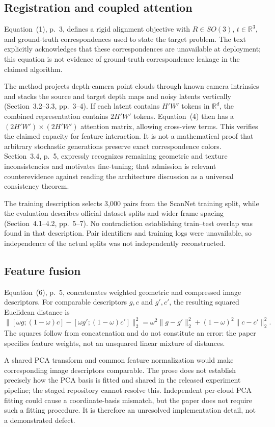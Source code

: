 \documentclass[10pt]{article}
\begin{document}
\subsection*{Registration and coupled attention}
Equation (1), p. 3, defines a rigid alignment objective with \(R\in SO(3)\), \(t\in\mathbb R^3\), and ground-truth correspondences used to state the target problem. The text explicitly acknowledges that these correspondences are unavailable at deployment; this equation is not evidence of ground-truth correspondence leakage in the claimed algorithm.\par
The method projects depth-camera point clouds through known camera intrinsics and stacks the source and target depth maps and noisy latents vertically (Section 3.2–3.3, pp. 3–4). If each latent contains \(H'W'\) tokens in \(\mathbb R^d\), the combined representation contains \(2H'W'\) tokens. Equation (4) then has a \((2H'W')\times(2H'W')\) attention matrix, allowing cross-view terms. This verifies the claimed capacity for feature interaction. It is not a mathematical proof that arbitrary stochastic generations preserve exact correspondence colors. Section 3.4, p. 5, expressly recognizes remaining geometric and texture inconsistencies and motivates fine-tuning; that admission is relevant counterevidence against reading the architecture discussion as a universal consistency theorem.\par
The training description selects 3,000 pairs from the ScanNet training split, while the evaluation describes official dataset splits and wider frame spacing (Section 4.1–4.2, pp. 5–7). No contradiction establishing train–test overlap was found in that description. Pair identifiers and training logs were unavailable, so independence of the actual splits was not independently reconstructed.\par
\subsection*{Feature fusion}
Equation (6), p. 5, concatenates weighted geometric and compressed image descriptors. For comparable descriptors \(g,c\) and \(g',c'\), the resulting squared Euclidean distance is \[\|[\omega g;(1-\omega)c]-[\omega g';(1-\omega)c']\|_2^2
 =\omega^2\|g-g'\|_2^2+(1-\omega)^2\|c-c'\|_2^2 .\] The squares follow from concatenation and do not constitute an error: the paper specifies feature weights, not an unsquared linear mixture of distances.\par
A shared PCA transform and common feature normalization would make corresponding image descriptors comparable. The prose does not establish precisely how the PCA basis is fitted and shared in the released experiment pipeline; the staged repository cannot resolve this. Independent per-cloud PCA fitting could cause a coordinate-basis mismatch, but the paper does not require such a fitting procedure. It is therefore an unresolved implementation detail, not a demonstrated defect.\par
\end{document}

